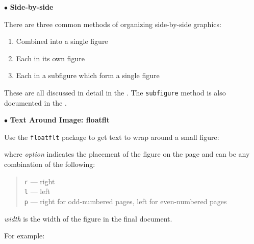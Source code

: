 \documentclass[11pt,twoside,nolof]{starlink}
\begin{document}
$\bullet$ \textbf{Side-by-side}

    There are three common methods of organizing side-by-side graphics:

    \begin{enumerate}
      \item Combined into a single figure
      \item Each in its own figure
      \item Each in a subfigure which form a single figure
    \end{enumerate}

    These are all discussed in detail in the
    \cite[part IV, section 12, pp 41-48]{eps}.
    The \texttt{subfigure} method is also documented in the
    \cite{subfigure}.

$\bullet$ \textbf{Text Around Image: floatflt}

  Use the \texttt{floatflt} package to get text to wrap around a small figure:


where \emph{option} indicates the placement of the figure on the page and
can be any combination of the following:
\begin{quote}
  \texttt{r} --- right\\
  \texttt{l} --- left\\
  \texttt{p} --- right for odd-numbered pages, left for even-numbered pages
\end{quote}

\emph{width} is the width of the figure in the final document.

For example:

\end{document}
